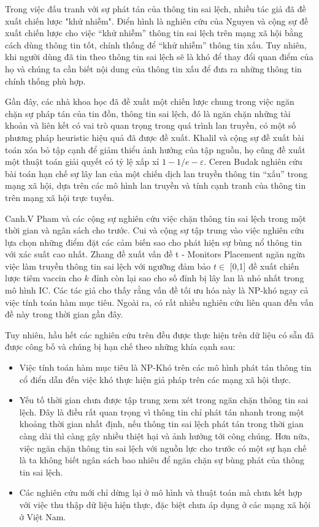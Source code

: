 Trong việc đấu tranh với sự phát tán của thông tin sai lệch, nhiều tác giả đã đề xuất chiến lược "khử nhiễm". Điển hình là nghiên cứu của Nguyen và cộng sự \cite{nguyen9} đề xuất chiến lược cho việc “khử nhiễm” thông tin sai lệch trên mạng xã hội bằng cách dùng thông tin tốt, chính thống để “khử nhiễm” thông tin xấu. Tuy nhiên, khi người dùng đã tin theo thông tin sai lệch sẽ là khó để thay đổi quan điểm của họ và chúng ta cần biết nội dung của thông tin xấu để đưa ra những thông tin chính thống phù hợp.

Gần đây, các nhà khoa học đã đề xuất một chiến lược chung trong việc ngăn chặn sự pháp tán của tin đồn, thông tin sai lệch, đó là ngăn chặn những tài khoản và liên kết có vai trò quan trọng trong quá trình lan truyền, có một số phương pháp heuristic hiệu quả đã được đề xuất. Khalil \cite{khalil} và cộng sự đề xuất bài toán xóa bỏ tập cạnh để giảm thiểu ảnh hưởng của tập nguồn, họ cũng đề xuất một thuật toán giải quyết có tỷ lệ xấp xỉ $1 - 1/e - \varepsilon$. Ceren Budak \cite{budak} nghiên cứu bài toán hạn chế sự lây lan của một chiến dịch lan truyền thông tin “xấu”  trong mạng xã hội, dựa trên các mô hình lan truyền và tính cạnh tranh của thông tin trên mạng xã hội trực tuyến. 

Canh.V Pham \cite{cvpham} và các cộng sự nghiên cứu việc chặn thông tin sai lệch trong một thời gian và ngân sách cho trước. Cui \cite{cui} và cộng sự tập trung vào việc nghiên cứu lựa chọn những điểm đặt các cảm biến sao cho phát hiện sự bùng nổ thông tin với xác suất cao nhất. Zhang đề xuất vấn đề t - Monitors Placement  ngăn ngừa việc làm truyền thông tin sai lệch với ngưỡng đảm bảo $t \in$ [0,1] đề xuất chiến lược tiêm vaccin cho $k$ đỉnh còn lại sao cho số đỉnh bị lây lan là nhỏ nhất trong mô hình IC. Các tác giả cho thấy rằng vấn đề tối ưu hóa này là NP-khó ngay cả việc tính toán hàm mục tiêu. Ngoài ra, có rất nhiều nghiên cứu liên quan đến vấn đề này trong thời gian gần đây.

Tuy nhiên, hầu hết các nghiên cứu trên đều được thực hiện trên dữ liệu có sẵn đã được công bố và chúng bị hạn chế theo những khía cạnh sau:
\begin {itemize}
	\item Việc tính toán hàm mục tiêu là NP-Khó trên các mô hình phát tán thông tin cổ điển dẫn đến việc khó thực hiện giả pháp trên các mạng xã hội thực.
	
	\item Yếu tố thời gian chưa được tập trung xem xét trong ngăn chặn thông tin sai lệch. Đây là điều rất quan trọng vì thông tin chỉ phát tán nhanh trong một khoảng thời gian nhất định, nếu thông tin sai lệch phát tán trong thời gian càng dài thì càng gây nhiều thiệt hại và ảnh hưởng tới công chúng. Hơn nữa, việc ngăn chặn thông tin sai lệch với nguồn lực cho trước có một sự hạn chế là ta không biết ngân sách bao nhiêu để ngăn chặn sự bùng phát của thông tin sai lệch.
	
	\item Các nghiên cứu mới chỉ dừng lại ở mô hình và thuật toán mà chưa kết hợp với việc thu thập dữ liệu hiện thực, đặc biệt chưa áp dụng ở các mạng xã hội ở Việt Nam.
\end {itemize}

